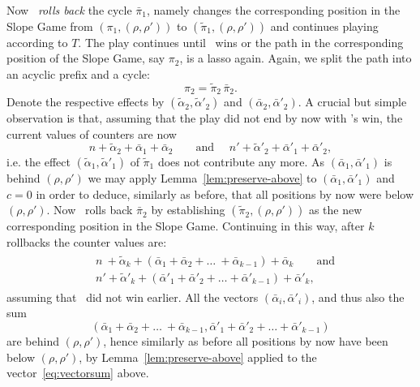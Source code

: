 Now \R\ \emph{rolls back} the cycle $\bar\pi_1$, namely changes the corresponding
position in the Slope Game from $(\pi_1, (\rho,\rho'))$ to $(\widetilde\pi_1,(\rho,\rho'))$ 
and continues playing according to $T$. 
The play continues until \R\ wins or the path in the corresponding position of the
Slope Game, say $\pi_2$, is a lasso again. Again, we split the path into an acyclic
prefix and a cycle:
\begin{equation}
  \pi_2 = \widetilde\pi_2 \, \bar\pi_2.
\end{equation}
Denote the respective effects by $(\widetilde\alpha_2, \widetilde\alpha'_2)$
and $(\bar\alpha_2, \bar\alpha'_2)$.
A crucial but simple observation is that, assuming that the play did not end by now with \R's win,
the current values of counters are now
\begin{equation}
    n + \widetilde\alpha_2 + \bar\alpha_1 + \bar\alpha_2 \qquad \text{and }\quad
    n' + \widetilde\alpha'_2 + \bar\alpha'_1 + \bar\alpha'_2,
\end{equation}
i.e. the effect $(\widetilde\alpha_1, \widetilde\alpha'_1)$ of $\widetilde\pi_1$ does not contribute any more.
As $(\bar\alpha_1, \bar\alpha'_1)$ is behind $(\rho,\rho')$ we may
apply Lemma~\ref{lem:preserve-above} to $(\bar\alpha_1, \bar\alpha'_1)$ and $c = 0$
in order to deduce, similarly as before, that all positions by now were below $(\rho,\rho')$.
Now \R\ rolls back $\bar\pi_2$ by establishing $(\widetilde\pi_2, (\rho,\rho'))$ as
the new corresponding position in the Slope Game.
Continuing in this way, after $k$ rollbacks the counter values are:
\begin{align}
\begin{aligned}
 &n\ + \widetilde\alpha_k + (\bar\alpha_1 + \bar\alpha_2 + \ldots \ + \bar\alpha_{k-1}) + \bar\alpha_k
 \qquad \text{and}\\
 &n' + \widetilde\alpha'_k + (\bar\alpha'_1 + \bar\alpha'_2 + \ldots + \bar\alpha'_{k-1}) + \bar\alpha'_k,
 \end{aligned}
\end{align}
assuming that \R\ did not win earlier. 
All the vectors $(\bar\alpha_i, \bar\alpha'_i)$, and thus also the sum
\begin{equation}\label{eq:vectorsum}
  (\bar\alpha_1 + \bar\alpha_2 + \ldots \ + \bar\alpha_{k-1}, \bar\alpha'_1 + \bar\alpha'_2 + \ldots + \bar\alpha'_{k-1})
\end{equation}
are behind $(\rho,\rho')$, hence similarly as before all positions by now have been below $(\rho,\rho')$,
by Lemma~\ref{lem:preserve-above} applied to the vector~\eqref{eq:vectorsum} above.

